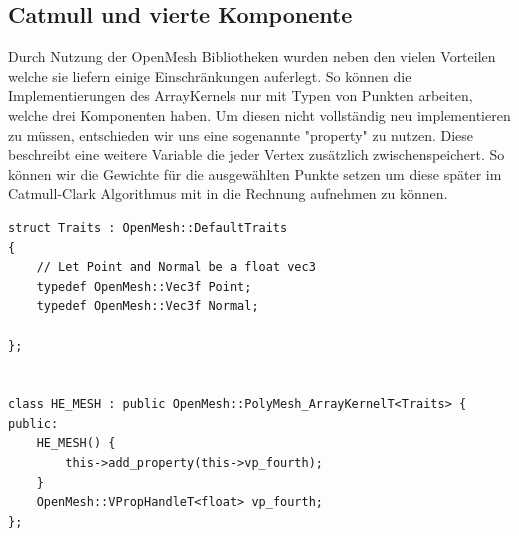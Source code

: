 \subsection{Catmull und vierte Komponente}

Durch Nutzung der OpenMesh Bibliotheken wurden neben den vielen Vorteilen welche sie liefern einige Einschränkungen auferlegt. So können die Implementierungen des ArrayKernels nur mit Typen von Punkten arbeiten, welche drei Komponenten haben. Um diesen nicht vollständig neu implementieren zu müssen, entschieden wir uns eine sogenannte "property" zu nutzen. Diese beschreibt eine weitere Variable die jeder Vertex zusätzlich zwischenspeichert. So können wir die Gewichte für die ausgewählten Punkte setzen um diese später im Catmull-Clark Algorithmus mit in die Rechnung aufnehmen zu können.

\begin{lstlisting}
struct Traits : OpenMesh::DefaultTraits
{
    // Let Point and Normal be a float vec3
    typedef OpenMesh::Vec3f Point;
    typedef OpenMesh::Vec3f Normal;

};


class HE_MESH : public OpenMesh::PolyMesh_ArrayKernelT<Traits> {
public:
    HE_MESH() {
        this->add_property(this->vp_fourth);
    }
    OpenMesh::VPropHandleT<float> vp_fourth;
};
\end{lstlisting}

